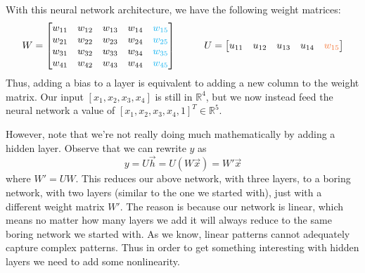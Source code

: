 \documentclass[12pt,letterpaper]{book}
\theoremstyle{definition}
\begin{document}
\begin{center}
  \end{center}
  With this neural network architecture, we have the following weight matrices:
  \[
    W = \begin{bmatrix}
      w_{11} & w_{12} & w_{13} & w_{14} & \textcolor{ProcessBlue}{w_{15}} \\
      w_{21} & w_{22} & w_{23} & w_{24} & \textcolor{ProcessBlue}{w_{25}}\\
      w_{31} & w_{32} & w_{33} & w_{34} & \textcolor{ProcessBlue}{w_{35}}\\
      w_{41} & w_{42} & w_{43} & w_{44} & \textcolor{ProcessBlue}{w_{45}}\\
    \end{bmatrix}
    \hspace{1cm}
    U = \begin{bmatrix}
      u_{11} & u_{12} & u_{13} & u_{14} & \textcolor{Orange}{w_{15}} \\
    \end{bmatrix}
  \]
  Thus, adding a bias to a layer is equivalent to adding a new column to the weight matrix. 
  Our input $[x_1, x_2, x_3, x_4]$ is still in $\mathbb{R}^4$, but we now instead 
  feed the neural network a value of $[x_1, x_2, x_3, x_4, 1]^T \in \mathbb{R}^5.$

  However, note that we're not really doing much mathematically by adding a hidden layer. 
  Observe that we can rewrite $y$ as 
  \[
      y = U\vec{h} = U(W\vec{x}) = W'\vec{x} 
  \]
  where $W' = UW$. This reduces our above network, with three layers, to a boring network, with two layers (similar to the one 
  we started with), just with a different weight matrix $W'$. 
  The reason is because our network is linear, which means 
  no matter how many layers we add it will always reduce to the same boring network we started with. 
  As we know, linear patterns cannot adequately capture complex patterns.
  Thus in order to get something interesting with hidden layers we need to add some nonlinearity.
  
\end{document}
